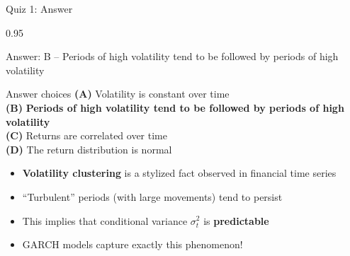 \documentclass[9pt, aspectratio=169, t]{beamer}
\begin{document}
\begin{frame}{Quiz 1: Answer}
    \begin{cminipage}{0.95\textwidth}
    \begin{exampleblock}{Answer: B -- Periods of high volatility tend to be followed by periods of high volatility}

    \vspace{0.1cm}

    \begin{block}{Answer choices}
        \textcolor{MainBlue}{\textbf{(A)}} Volatility is constant over time \incorrect\\[3pt]
        \textcolor{MainBlue}{\textbf{(B)}} \textbf{\textcolor{Forest}{Periods of high volatility tend to be followed by periods of high volatility}} \correct\\[3pt]
        \textcolor{MainBlue}{\textbf{(C)}} Returns are correlated over time \incorrect\\[3pt]
        \textcolor{MainBlue}{\textbf{(D)}} The return distribution is normal \incorrect
    \end{block}

        \vspace{0.1cm}

        \begin{itemize}
            \item \textbf{Volatility clustering} is a stylized fact observed in financial time series
            \item ``Turbulent'' periods (with large movements) tend to persist
            \item This implies that conditional variance $\sigma_t^2$ is \textbf{predictable}
            \item GARCH models capture exactly this phenomenon!
        \end{itemize}
    \end{exampleblock}

    \end{cminipage}
\end{frame}
\end{document}
